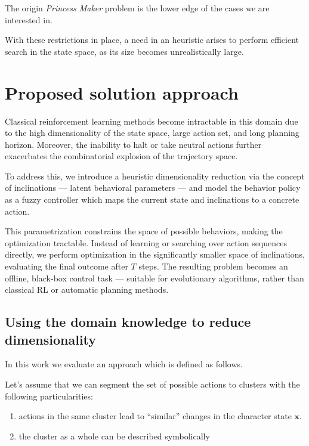 \documentclass[12pt, a4paper]{report}
\begin{document}
	The origin \textit{Princess Maker} problem is the lower edge of the cases we are interested in.

	With these restrictions in place, a need in an heuristic arises to perform efficient search in the state space, as its size becomes unrealistically large.
	
	\chapter{Proposed solution approach}\label{section::solution}

Classical reinforcement learning methods become intractable in this domain due to the high dimensionality of the state space, large action set, and long planning horizon. Moreover, the inability to halt or take neutral actions further exacerbates the combinatorial explosion of the trajectory space.

To address this, we introduce a heuristic dimensionality reduction via the concept of inclinations — latent behavioral parameters — and model the behavior policy as a fuzzy controller which maps the current state and inclinations to a concrete action.

This parametrization constrains the space of possible behaviors, making the optimization tractable. Instead of learning or searching over action sequences directly, we perform optimization in the significantly smaller space of inclinations, evaluating the final outcome after $T$ steps. The resulting problem becomes an offline, black-box control task — suitable for evolutionary algorithms, rather than classical RL or automatic planning methods.

	\section{Using the domain knowledge to reduce dimensionality}

	In this work we evaluate an approach which is defined as follows.
	
	Let's assume that we can segment the set of possible actions to clusters with the following particularities:
	
	\begin{enumerate}
		\item actions in the same cluster lead to ``similar'' changes in the character state $\mathbf{x}$.
		\item the cluster as a whole can be described symbolically
	\end{enumerate}
	
\end{document}

